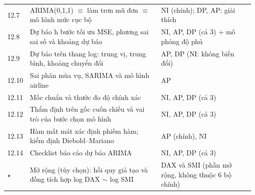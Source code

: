 \begin{longtable}{@{}p{1.1cm}p{8.2cm}p{5cm}@{}}
12.7 & ARIMA(0,1,1) $\equiv$ làm trơn mũ đơn $\equiv$ mô hình mức cục bộ & NI (chính); DP, AP: giải thích \\
12.8 & Dự báo h bước tối ưu MSE, phương sai sai số và khoảng dự báo & NI, AP, DP (cả 3) + mô phỏng độ phủ \\
12.9 & Dự báo trên thang log: trung vị, trung bình, khoảng chuyển đổi & AP, DP (NI: không biến đổi) \\
12.10 & Sai phân mùa vụ, SARIMA và mô hình airline & AP \\
12.11 & Mốc chuẩn và thước đo độ chính xác & NI, AP, DP (cả 3) \\
12.12 & Thẩm định trên gốc cuốn chiếu và vai trò của bước chọn mô hình & NI, AP, DP (cả 3) \\
12.13 & Hàm mất mát xác định phiếm hàm; kiểm định Diebold–Mariano & AP (chính), NI \\
12.14 & Checklist báo cáo dự báo ARIMA & NI, AP, DP (cả 3) \\
$\star$ & Mở rộng (tùy chọn): hồi quy giả tạo và đồng tích hợp log DAX $\sim$ log SMI & DAX và SMI (phần mở rộng, không thuộc 6 bộ chính) \\
\bottomrule
\end{longtable}
